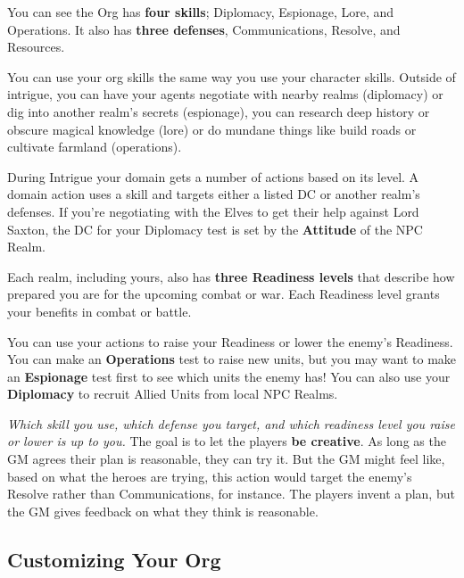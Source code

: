 \documentclass[letterpaper,twocolumn,openany,nodeprecatedcode]{dndbook}
\begin{document}
You can see the Org has \textbf{four skills}; Diplomacy, Espionage, Lore, and Operations.
It also has \textbf{three defenses}, Communications, Resolve, and Resources.

You can use your org skills the same way you use your character skills.
Outside of intrigue, you can have your agents negotiate with nearby realms (diplomacy) or dig into another realm’s secrets (espionage), you can research deep history or obscure magical knowledge (lore) or do mundane things like build roads or cultivate farmland (operations).

During Intrigue your domain gets a number of actions based on its level.
A domain action uses a skill and targets either a listed DC or another realm’s defenses.
If you’re negotiating with the Elves to get their help against Lord Saxton, the DC for your Diplomacy test is set by the \textbf{Attitude} of the NPC Realm.

Each realm, including yours, also has \textbf{three Readiness levels} that describe how prepared you are for the upcoming combat or war.
Each Readiness level grants your benefits in combat or battle.

You can use your actions to raise your Readiness or lower the enemy’s Readiness.
You can make an \textbf{Operations} test to raise new units, but you may want to make an \textbf{Espionage} test first to see which units the enemy has!
You can also use your \textbf{Diplomacy} to recruit Allied Units from local NPC Realms.


\textit{Which skill you use, which defense you target, and which readiness level you raise or lower is up to you.}
The goal is to let the players \textbf{be creative}.
As long as the GM agrees their plan is reasonable, they can try it.
But the GM might feel like, based on what the heroes are trying, this action would target the enemy’s Resolve rather than Communications, for instance.
The players invent a plan, but the GM gives feedback on what they think is reasonable.

\subsection{Customizing Your Org}
\end{document}
